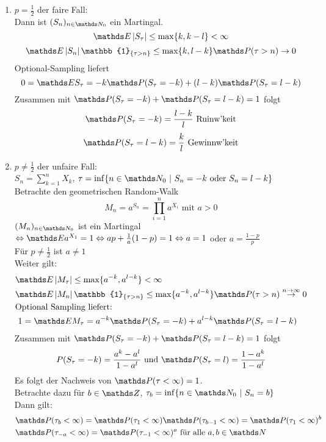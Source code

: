 \begin{enumerate}
	\item $p=\frac{1}{2}$ der faire Fall:\\
	Dann ist $(S_n)_{n\in \N_0}$ ein Martingal.
	\[
	\E\abs{S_\tau}\le \max\{k,k-l\}<\infty
	\]
	\[
	\E\abs{S_n}\mathbb{1}_{\{\tau>n\}}\le \max\{k,l-k\}\Pw(\tau>n)\to 0 
	\]
	Optional-Sampling liefert 
	\[
	0=\E S_\tau= -k\Pw(S_\tau=-k)+(l-k)\Pw(S_\tau=l-k) 
	\]
	Zusammen mit $\Pw(S_\tau=-k)+\Pw(S_\tau=l-k)=1$ folgt
	\[
	\Pw(S_\tau=-k)=\frac{l-k}{l}\text{ Ruinw'keit} 
	\]
	\[
	\Pw(S_\tau=l-k)=\frac{k}{l}\text{ Gewinnw'keit} 
	\]
	\item $p\not= \frac{1}{2}$ der unfaire Fall:\\
	$S_n=\sum_{k=1}^{n}X_k$, $\tau=\inf\{n\in \N_0~|~S_n=-k\text{ oder }S_n=l-k\}$\\
	Betrachte den geometrischen Random-Walk 
	\[
	M_n=a^{S_n}=\prod_{i=1}^{n}a^{X_i}\text{ mit }a>0 
	\]
	$(M_n)_{n\in \N_0}$ ist ein Martingal $\Leftrightarrow \E a^{X_1}=1 \Leftrightarrow ap+\frac{1}{a}(1-p)=1 \Leftrightarrow a=1$ oder $a=\frac{1-p}{p}$\\
	Für $p\not= \frac{1}{2}$ ist $a\not=1$\\
	Weiter gilt:
	\begin{equation*}
	\begin{aligned}
		&\E \abs{M_\tau}\le \max\{a^{-k},a^{l-k}\}<\infty\\
		&\E\abs{M_n}\mathbb{1}_{\{\tau>n\}}\le \max\{a^{-k},a^{l-k}\}\Pw(\tau>n)\stackrel{n\to\infty}{\to}0\\
		&\text{Optional Sampling liefert: }\\
		&~1=\E M_\tau=a^{-k}\Pw(S_\tau=-k)+a^{l-k}\Pw(S_\tau=l-k)
	\end{aligned}
	\end{equation*}
	Zusammen mit $\Pw(S_\tau=-k)+\Pw(S_\tau=l-k)=1$ folgt
	\[
	P(S_\tau=-k)=\frac{a^k-a^l}{1-a^l}\text{ und } \Pw(S_\tau=l)=\frac{1-a^k}{1-a^l}
	\]
	Es folgt der Nachweis von $\Pw(\tau<\infty)=1$.\\
	Betrachte dazu für $b\in \Z$, $\tau_b=\inf\{n\in \N_0~|~S_n=b\}$\\
	Dann gilt:
	\begin{equation*}
	\begin{aligned}
		&\Pw(\tau_b<\infty)=\Pw(\tau_1<\infty)\Pw(\tau_{b-1}<\infty)=\Pw(\tau_1<\infty)^b\\
		&\Pw(\tau_{-a}<\infty)=\Pw(\tau_{-1}<\infty)^a \text{ für alle }a,b\in \N
	\end{aligned}
	\end{equation*}

\end{enumerate}
